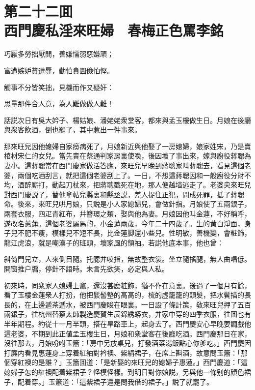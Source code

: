 
\chapter*{第二十二囬　\\西門慶私淫來旺婦　春梅正色罵李銘}


\begin{myquote}
巧厭多勞拙厭閒，善嫌懦弱惡嫌頑；

富遭嫉妒貧遭辱，勤怕貪圖儉怕慳。

觸事不分皆笑拙，見機而作又疑奸：

思量那件合人意，為人難做做人難！
\end{myquote}

話説次日有吳大妗子、楊姑娘、潘姥姥衆堂客，都來與孟玉樓做生日。月娘在後廳與衆客飲酒，倒也罷了，其中惹出一件事來。

那來旺兒因他媳婦自家癆病死了，月娘新近與他娶了一房媳婦，娘家姓宋，乃是賣棺材宋仁的女兒。當先賣在蔡通判家房裏使喚，後因壞了事出來，嫁與廚役蔣聰為妻小。這蔣聰常在西門慶家做活答應，來旺兒早晚到蔣聰家叫蔣聰去，看見這個老婆，兩個吃酒刮言，就把這個老婆刮上了。一日，不想這蔣聰因和一般廚役分財不均，酒醉廝打，動起刀杖來，把蔣聰戳死在地，那人便越墙逃走了。老婆央來旺兒對西門慶説了，替他拿帖兒縣裏和縣丞説，差人捉住正犯，問成死罪，抵了蔣聰命。後來，來旺兒哄月娘，只説是小人家媳婦兒，會做針指。月娘使了五兩銀子，兩套衣服，四疋青紅布，幷簪環之類，娶與他為妻。月娘因他叫金蓮，不好稱呼，遂改名蕙蓮。這個老婆屬馬的，小金蓮兩歲，今年二十四歲了。生的黄白淨面，身子兒不肥不瘦，模樣兒不短不長，比金蓮脚還小些兒。性明敏，善機變，會粧飾，龍江虎浪，就是嘲漢子的班頭，壞家風的領袖。若説他底本事，他也曾：

\begin{myquote}
斜倚門兒立，人來側目隨。托腮并咬指，無故整衣裳。坐立隨搖腿，無人曲唱低。開窗推户牖，停針不語時。未言先欲笑，必定與人私。
\end{myquote}

初來時，同衆家人媳婦上竃，還沒甚麽粧飾，猶不作在意裏。後過了一個月有餘，看了玉樓金蓮衆人打扮，他把䯼髻墊的高高的，梳的虚籠籠的頭髮，把水鬢描的長長的，在上邊遞茶遞水，被西門慶睃在眼裏。一日設了條計策，敎來旺兒押了五百兩銀子，往杭州替蔡太師製造慶賀生辰錦綉蟒衣，并家中穿的四季衣服，往囬也有半年期程。約従十一月半頭，搭在旱路車上，起身去了。西門慶安心早晚要調戲他這老婆，不期到此正値孟玉樓生日，月娘和衆堂客在後廳吃酒。西門慶那日在家，沒往那去，月娘吩咐玉簫：「房中另放桌兒，打發酒菜湯飯點心你爹吃。」西門慶因打簾内看見惠蓮身上穿着紅紬對衿襖、紫絹裙子，在席上斟酒，故意問玉簫：「那個穿紅襖的是誰？」玉簫囬道：「是新娶的來旺兒的媳婦子惠蓮。」西門慶道：「這媳婦子怎的紅襖配着紫裙子？怪模怪樣。到明日對你娘説，另與他一條别的顔色裙子，配着穿。」玉簫道：「這紫裙子還是問我借的裙子。」説了就罷了。

